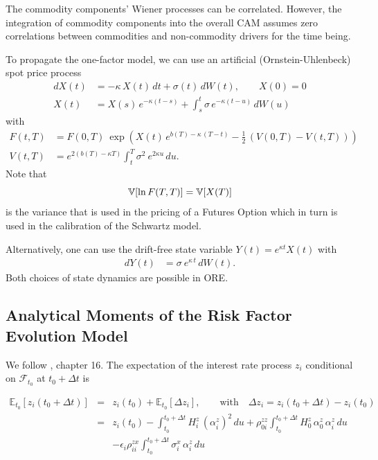 The commodity components' Wiener processes can be correlated. However, the integration of commodity components into the overall CAM assumes zero correlations between commodities and non-commodity drivers for the time being.

To propagate the one-factor model, we can use an artificial (Ornstein-Uhlenbeck) spot price process
\begin{align*}
dX(t) &= -\kappa\,X(t)\,dt + \sigma(t)\,dW(t), \qquad X(0)=0\\
X(t) &= X(s)\,e^{-\kappa(t-s)}+ \int_s^t \sigma\,e^{-\kappa(t-u)}\, dW(u)
\end{align*}
with 
\begin{align*}
F(t,T) &= F(0,T) \:\exp\left( X(t)\,e^{b(T)-\kappa\,(T-t)} - \frac{1}{2}\,(V(0,T)-V(t,T))  \right) \\
V(t,T) &= e^{2 (b(T)-\kappa T)}\int_t^T\sigma^2\:e^{2\kappa u}\,du.
\end{align*}
Note that 
$$
\operatorname{\mathbb{V}}[\ln F(T,T)] = \operatorname{\mathbb{V}}[X(T)] 
$$
is the variance that is used in the pricing of a Futures Option which in turn is used in the calibration of the Schwartz model.

Alternatively, one can use the drift-free state variable $Y(t)=e^{\kappa t} X(t)$ with
\begin{align*}
dY(t) &= \sigma \: e^{\kappa \, t} \, dW(t).
\end{align*}
Both choices of state dynamics are possible in ORE. 

\subsection{Analytical Moments of the Risk Factor Evolution Model}\label{sec:app_analytical_moments}

We follow \cite{Lichters}, chapter 16. The expectation of the interest rate process $z_i$ conditional on $\mathcal{F}_{t_0}$ at $t_0+\Delta t$ is

\begin{eqnarray*}
  \mathbb{E}_{t_0}[z_i(t_0+\Delta t)] &=& z_i(t_0) + \mathbb{E}_{t_0}[\Delta z_i],
  \qquad\mbox{with}\quad \Delta z_i = z_i(t_0+\Delta t) - z_i(t_0) \\
  &=& z_i(t_0) -\int_{t_0}^{t_0+\Delta t} H^z_i\,(\alpha^z_i)^2\,du + \rho^{zz}_{0i} \int_{t_0}^{t_0+\Delta t}
  H^z_0\,\alpha^z_0\,\alpha^z_i\,du \\
  & & - \epsilon_i  \rho^{zx}_{ii}\int_{t_0}^{t_0+\Delta t} \sigma_i^x\,\alpha^z_i\,du
\end{eqnarray*}

